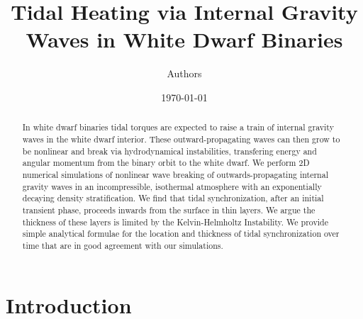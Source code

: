 \documentclass[twocolumn,
        nofootinbib,
        usenames, %
        dvipsnames %
    ]{revtex4-1}%
\begin{document}
\def\Snospace~{\S{}} %
\renewcommand*{\sectionautorefname}{\Snospace}
\renewcommand*{\appendixautorefname}{\Snospace}
\renewcommand*{\figureautorefname}{Fig.}
\renewcommand*{\equationautorefname}{Eq.}
\renewcommand*{\tableautorefname}{Tab.}

\begin{abstract}
    In white dwarf binaries tidal torques are expected to raise a train of
    internal gravity waves in the white dwarf interior. These
    outward-propagating waves can then grow to be nonlinear and break via
    hydrodynamical instabilities, transfering energy and angular momentum from
    the binary orbit to the white dwarf. We perform 2D numerical simulations of
    nonlinear wave breaking of outwards-propagating internal gravity waves in an
    incompressible, isothermal atmosphere with an exponentially decaying density
    stratification. We find that tidal synchronization, after an initial
    transient phase, proceeds inwards from the surface in thin layers. We argue
    the thickness of these layers is limited by the Kelvin-Helmholtz
    Instability. We provide simple analytical formulae for the location and
    thickness of tidal synchronization over time that are in good agreement with
    our simulations.
\end{abstract}

\title{Tidal Heating via Internal Gravity Waves in White Dwarf Binaries}
\author{Authors}
\date{\today}
\maketitle

\section{Introduction}



\end{document}
